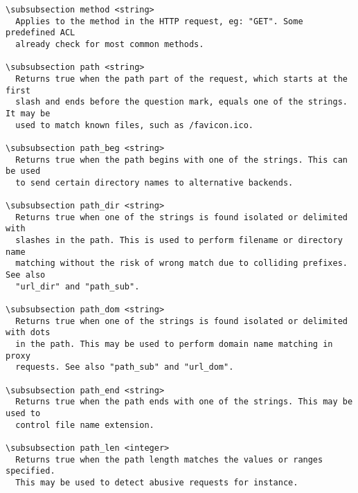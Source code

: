 \begin{verbatim}
\subsubsection method <string>
  Applies to the method in the HTTP request, eg: "GET". Some predefined ACL
  already check for most common methods.

\subsubsection path <string>
  Returns true when the path part of the request, which starts at the first
  slash and ends before the question mark, equals one of the strings. It may be
  used to match known files, such as /favicon.ico.

\subsubsection path_beg <string>
  Returns true when the path begins with one of the strings. This can be used
  to send certain directory names to alternative backends.

\subsubsection path_dir <string>
  Returns true when one of the strings is found isolated or delimited with
  slashes in the path. This is used to perform filename or directory name
  matching without the risk of wrong match due to colliding prefixes. See also
  "url_dir" and "path_sub".

\subsubsection path_dom <string>
  Returns true when one of the strings is found isolated or delimited with dots
  in the path. This may be used to perform domain name matching in proxy
  requests. See also "path_sub" and "url_dom".

\subsubsection path_end <string>
  Returns true when the path ends with one of the strings. This may be used to
  control file name extension.

\subsubsection path_len <integer>
  Returns true when the path length matches the values or ranges specified.
  This may be used to detect abusive requests for instance.


\end{verbatim}
